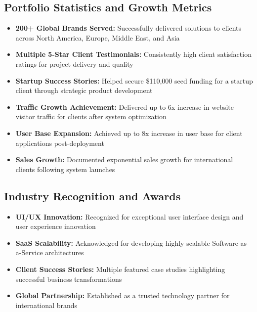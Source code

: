\documentclass[12pt,a4paper]{report}
\newcommand{\skill}[1]{\textcolor{skillcolor}{\textbf{#1}}}
\newenvironment{coloritemize}
{\begin{itemize}[label=\textcolor{primaryblue}{$\bullet$}]}
{\end{itemize}}
\begin{document}
\subsection{Portfolio Statistics and Growth Metrics}
\begin{coloritemize}
    \item \skill{200+ Global Brands Served:} Successfully delivered solutions to clients across North America, Europe, Middle East, and Asia
    \item \skill{Multiple 5-Star Client Testimonials:} Consistently high client satisfaction ratings for project delivery and quality
    \item \skill{Startup Success Stories:} Helped secure \$110,000 seed funding for a startup client through strategic product development
    \item \skill{Traffic Growth Achievement:} Delivered up to 6x increase in website visitor traffic for clients after system optimization
    \item \skill{User Base Expansion:} Achieved up to 8x increase in user base for client applications post-deployment
    \item \skill{Sales Growth:} Documented exponential sales growth for international clients following system launches
\end{coloritemize}

\subsection{Industry Recognition and Awards}
\begin{coloritemize}
    \item \skill{UI/UX Innovation:} Recognized for exceptional user interface design and user experience innovation
    \item \skill{SaaS Scalability:} Acknowledged for developing highly scalable Software-as-a-Service architectures
    \item \skill{Client Success Stories:} Multiple featured case studies highlighting successful business transformations
    \item \skill{Global Partnership:} Established as a trusted technology partner for international brands
\end{coloritemize}
\end{document}
